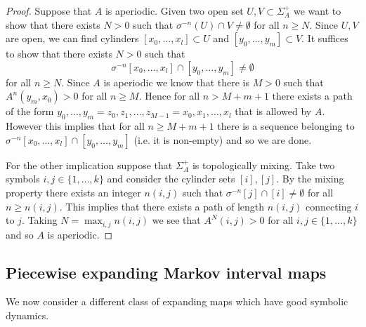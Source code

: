 \documentclass[12pt]{article}
\theoremstyle{definition}
\theoremstyle{remark}
\begin{document}
\begin{proof}
Suppose that $A$ is aperiodic. Given two open set $U, V \subset \Sigma_A^+$ we want to show that there exists $N > 0$ such that $\sigma^{-n}(U) \cap V \neq \emptyset$ for all $n \ge N$. Since $U, V$ are open, we can find cylinders $[x_0, \ldots, x_l] \subset U$ and $[y_0,\ldots, y_m] \subset V$. It suffices to show that there exists $N > 0$ such that 
\[
\sigma^{-n}[x_0, \ldots, x_l] \cap [y_0, \ldots, y_m] \neq \emptyset
\]
for all $n\ge N$. Since $A$ is aperiodic we know that there is $M >0$ such that $A^n(y_m,x_0) > 0$ for all $n \ge M$. Hence for all $n > M + m +1$ there exists a path of the form $y_0, \ldots, y_m = z_0, z_1, \ldots, z_{M-1}=x_0, x_1, \ldots, x_l$ that is allowed by $A$. However this implies that for all $n \ge M + m +1$ there is a sequence belonging to $\sigma^{-n}[x_0, \ldots, x_l] \cap [y_0, \ldots, y_m]$ (i.e. it is non-empty) and so we are done.

For the other implication suppose that $\Sigma_A^+$ is topologically mixing. Take two symbols $i,j \in \{1,\ldots,k\}$ and consider the cylinder sets $[i], [j]$. By the mixing property there exists an integer $n(i,j)$ such that $\sigma^{-n}[j] \cap [i] \neq \emptyset$ for all $n \ge n(i,j)$. This implies that there exists a path of length $n(i,j)$ connecting $i$ to $j$. Taking $N = \max_{i,j} n(i,j)$ we see that $A^N(i,j) >0$ for all $i,j \in \{1,\ldots, k \}$ and so $A$ is aperiodic.
\end{proof}






\subsection{Piecewise expanding Markov interval maps}

We now consider a different class of expanding maps which have good symbolic dynamics.
\end{document}
